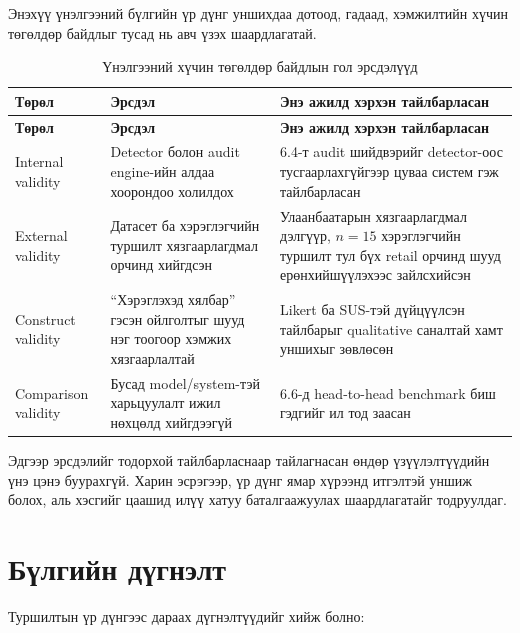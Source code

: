 Энэхүү үнэлгээний бүлгийн үр дүнг уншихдаа дотоод, гадаад, хэмжилтийн хүчин төгөлдөр байдлыг тусад нь авч үзэх шаардлагатай.

\begin{longtable}{|p{3.2cm}|p{3.9cm}|p{4.9cm}|}
\caption{Үнэлгээний хүчин төгөлдөр байдлын гол эрсдэлүүд}
\label{tab:validity_threats} \\
\hline
\textbf{Төрөл} & \textbf{Эрсдэл} & \textbf{Энэ ажилд хэрхэн тайлбарласан} \\
\hline
\endfirsthead
\hline
\textbf{Төрөл} & \textbf{Эрсдэл} & \textbf{Энэ ажилд хэрхэн тайлбарласан} \\
\hline
\endhead
\hline
\endfoot
Internal validity & Detector болон audit engine-ийн алдаа хоорондоо холилдох & 6.4-т audit шийдвэрийг detector-оос тусгаарлахгүйгээр цуваа систем гэж тайлбарласан \\
\hline
External validity & Датасет ба хэрэглэгчийн туршилт хязгаарлагдмал орчинд хийгдсэн & Улаанбаатарын хязгаарлагдмал дэлгүүр, \(n=15\) хэрэглэгчийн туршилт тул бүх retail орчинд шууд ерөнхийшүүлэхээс зайлсхийсэн \\
\hline
Construct validity & ``Хэрэглэхэд хялбар'' гэсэн ойлголтыг шууд нэг тоогоор хэмжих хязгаарлалтай & Likert ба SUS-тэй дүйцүүлсэн тайлбарыг qualitative саналтай хамт уншихыг зөвлөсөн \\
\hline
Comparison validity & Бусад model/system-тэй харьцуулалт ижил нөхцөлд хийгдээгүй & 6.6-д head-to-head benchmark биш гэдгийг ил тод заасан \\
\hline
\end{longtable}

Эдгээр эрсдэлийг тодорхой тайлбарласнаар тайлагнасан өндөр үзүүлэлтүүдийн үнэ цэнэ буурахгүй. Харин эсрэгээр, үр дүнг ямар хүрээнд итгэлтэй уншиж болох, аль хэсгийг цаашид илүү хатуу баталгаажуулах шаардлагатайг тодруулдаг.

\section{Бүлгийн дүгнэлт}

Туршилтын үр дүнгээс дараах дүгнэлтүүдийг хийж болно:


